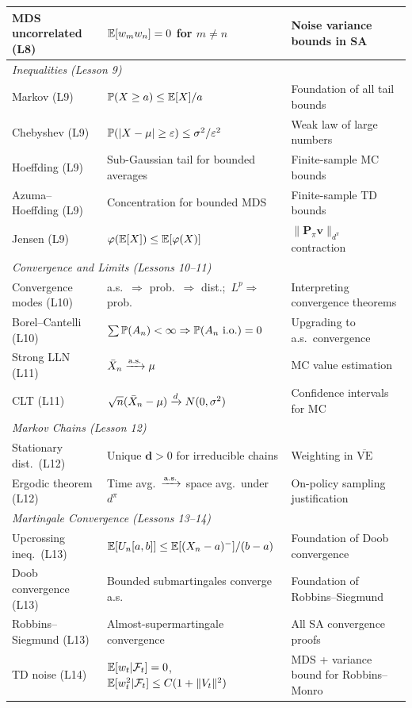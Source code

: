 \documentclass[11pt,a4paper]{article}
\begin{document}
\begin{center}
\begin{tabular}{p{2.5cm} p{4.5cm} p{5.5cm}}
\addlinespace
MDS uncorrelated (L8)
  & $\mathbb{E}[w_m w_n] = 0$ for $m \neq n$
  & Noise variance bounds in SA \\
\midrule
\multicolumn{3}{l}{\textit{Inequalities (Lesson 9)}} \\
\midrule
Markov (L9)
  & $\mathbb{P}(X \geq a) \leq \mathbb{E}[X]/a$
  & Foundation of all tail bounds \\
\addlinespace
Chebyshev (L9)
  & $\mathbb{P}(|X-\mu| \geq \varepsilon) \leq
    \sigma^2/\varepsilon^2$
  & Weak law of large numbers \\
\addlinespace
Hoeffding (L9)
  & Sub-Gaussian tail for bounded averages
  & Finite-sample MC bounds \\
\addlinespace
Azuma--Hoeffding (L9)
  & Concentration for bounded MDS
  & Finite-sample TD bounds \\
\addlinespace
Jensen (L9)
  & $\varphi(\mathbb{E}[X]) \leq \mathbb{E}[\varphi(X)]$
  & $\|\mathbf{P}_\pi \mathbf{v}\|_{d^\pi}$
    contraction \\
\midrule
\multicolumn{3}{l}{\textit{Convergence and Limits
  (Lessons 10--11)}} \\
\midrule
Convergence modes (L10)
  & a.s.\ $\Rightarrow$ prob.\ $\Rightarrow$ dist.;\
    $L^p \Rightarrow$ prob.
  & Interpreting convergence theorems \\
\addlinespace
Borel--Cantelli (L10)
  & $\sum \mathbb{P}(A_n) < \infty \Rightarrow
    \mathbb{P}(A_n\text{ i.o.}) = 0$
  & Upgrading to a.s.\ convergence \\
\addlinespace
Strong LLN (L11)
  & $\bar{X}_n \xrightarrow{\text{a.s.}} \mu$
  & MC value estimation \\
\addlinespace
CLT (L11)
  & $\sqrt{n}(\bar{X}_n - \mu) \xrightarrow{d} N(0,\sigma^2)$
  & Confidence intervals for MC \\
\midrule
\multicolumn{3}{l}{\textit{Markov Chains (Lesson 12)}} \\
\midrule
Stationary dist.\ (L12)
  & Unique $\boldsymbol{d} > 0$ for irreducible chains
  & Weighting in $\overline{\text{VE}}$ \\
\addlinespace
Ergodic theorem (L12)
  & Time avg.\ $\xrightarrow{\text{a.s.}}$ space avg.\ under $d^\pi$
  & On-policy sampling justification \\
\midrule
\multicolumn{3}{l}{\textit{Martingale Convergence
  (Lessons 13--14)}} \\
\midrule
Upcrossing ineq.\ (L13)
  & $\mathbb{E}[U_n[a,b]] \leq \mathbb{E}[(X_n-a)^-]/(b-a)$
  & Foundation of Doob convergence \\
\addlinespace
Doob convergence (L13)
  & Bounded submartingales converge a.s.
  & Foundation of Robbins--Siegmund \\
\addlinespace
Robbins--Siegmund (L13)
  & Almost-supermartingale convergence
  & All SA convergence proofs \\
\addlinespace
TD noise (L14)
  & $\mathbb{E}[w_t | \mathcal{F}_t] = 0$,\
    $\mathbb{E}[w_t^2|\mathcal{F}_t] \leq C(1+\|V_t\|^2)$
  & MDS + variance bound for Robbins--Monro \\
\bottomrule
\end{tabular}
\end{center}
\end{document}
